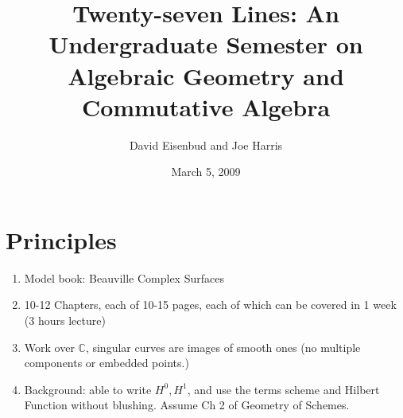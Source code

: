 \documentclass[12pt, leqno]{article}
\date{March 5, 2009}
\title{Twenty-seven Lines: An Undergraduate Semester on Algebraic Geometry and Commutative Algebra}
\author{David Eisenbud and Joe Harris }
\def\CC{{\mathbb C}}
\begin{document}
\maketitle


\section*{Principles}
\begin{enumerate}

\item Model book: Beauville Complex Surfaces

\item 10-12 Chapters, each of 10-15 pages, each of which can be covered in 1 week (3 hours lecture)

\item Work over $\CC$, singular curves are images of smooth ones (no multiple components or embedded points.)

\item Background: able to write $H^0, H^1$, and use the terms scheme and Hilbert Function  without blushing. Assume Ch 2 of Geometry of Schemes.

\end{enumerate}
\end{document}
